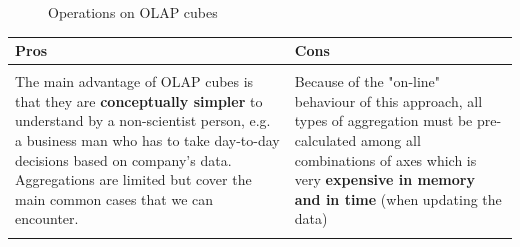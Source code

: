 \begin{figure} [h] %
\centerline{
}
\centerline{
}
\caption{\label{OLAP_operations} Operations on OLAP cubes} 
\end{figure}

\begin{center} %
\begin{tabular} {| l | l |}
\hline
\bf Pros & \bf Cons \\ \hline
& \\
\parbox[t][][t]{7cm}{The main advantage of OLAP cubes is that they are \textbf{conceptually simpler} to understand by a non-scientist person, e.g. a business man who has to take day-to-day decisions based on company's data. Aggregations are limited but cover the main common cases that we can encounter.
}&
\parbox[t][][t]{7cm}{Because of the "on-line" behaviour of this approach, all types of aggregation must be pre-calculated among all combinations of axes which is very \textbf{expensive in memory and in time} (when updating the data)}\\
& \\
\hline
\end{tabular}
\end{center}
